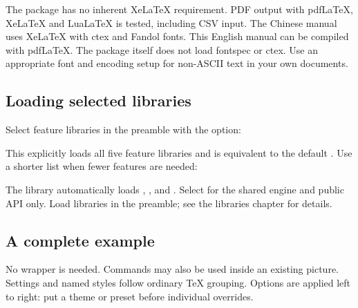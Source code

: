The package has no inherent XeLaTeX requirement. PDF output with pdfLaTeX,
XeLaTeX and LuaLaTeX is tested, including CSV input. The Chinese manual uses XeLaTeX with
ctex and Fandol fonts. This English manual can be compiled with pdfLaTeX.
The package itself does not load fontspec or ctex. Use an appropriate font and
encoding setup for non-ASCII text in your own documents.

\subsection{Loading selected libraries}
Select feature libraries in the preamble with the  option:
\begin{source}
\usepackage[libraries={stack,spark,heat,csv,table}]{gradbars}
\end{source}
This explicitly loads all five feature libraries and is equivalent to the
default \key{\usepackage{gradbars}}. Use a shorter list when fewer features are needed:
\begin{source}
\usepackage[libraries={stack,spark,heat}]{gradbars}
\end{source}
The  library automatically loads , , 
and . Select  for the shared engine and public API
only. Load libraries in the preamble; see the libraries chapter for details.

\subsection{A complete example}
No  wrapper is needed. Commands may also be used inside an
existing \manualTikZ{} picture. Settings and named styles follow ordinary TeX grouping.
Options are applied left to right: put a theme or preset before individual overrides.
